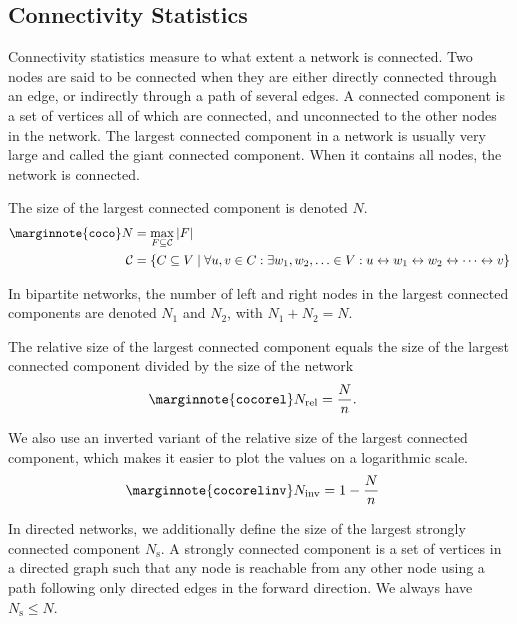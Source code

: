 \documentclass{article}
\begin{document}
\subsection{Connectivity Statistics}
Connectivity statistics measure to what extent a network is
connected. 
Two nodes are said to be connected when they are either directly
connected through an edge, or indirectly through a path of several
edges. 
A connected component is a set of vertices all of which are connected,
and unconnected to the other nodes in the network.  
The largest connected component in a network is usually very large and
called the giant connected component. When it contains all nodes, the
network is connected. 

The size of the largest connected component is denoted 
$N$.  
\begin{align}
  \marginnote{\texttt{coco}}
  N &= \max_{F \subseteq \mathcal C} |F|  \\
  \mathcal C &= \{ C \subseteq V \mid \forall u, v \in C:  \exists w_1,
  w_2, \ldots \in V:  u \leftrightarrow w_1 \leftrightarrow w_2 \leftrightarrow \cdots \leftrightarrow v \} \nonumber
\end{align}

In bipartite networks, the number of left and right nodes in the largest
connected components are denoted $N_1$ and $N_2$,
with $N_1 + N_2 = N$. 

The relative size of the largest connected component equals the
size of the largest connected component divided by the size of the
network
\begin{align}
  \marginnote{\texttt{cocorel}}
  N_{\mathrm{rel}} &= \frac N n. 
\end{align}

We also use an inverted variant of the relative size of the largest
connected component, which makes it easier to plot the values on a
logarithmic scale.
\begin{align}
  \marginnote{\texttt{cocorelinv}}
  N_{\mathrm{inv}} &= 1 - \frac N n 
\end{align}

In directed networks, we additionally define the size of the largest
strongly connected component $N_{\mathrm s}$.  A strongly
connected component is a 
set of vertices in a directed graph such that any node is reachable from
any other node using a path following only directed edges in the forward
direction.   We always have $N_{\mathrm s} \leq N$. 
\end{document}
